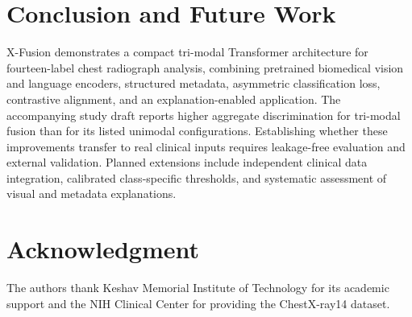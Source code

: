 \documentclass[conference,letterpaper]{IEEEtran}
\begin{document}
\section{Conclusion and Future Work}
X-Fusion demonstrates a compact tri-modal Transformer architecture for fourteen-label chest radiograph analysis, combining pretrained biomedical vision and language encoders, structured metadata, asymmetric classification loss, contrastive alignment, and an explanation-enabled application. The accompanying study draft reports higher aggregate discrimination for tri-modal fusion than for its listed unimodal configurations. Establishing whether these improvements transfer to real clinical inputs requires leakage-free evaluation and external validation. Planned extensions include independent clinical data integration, calibrated class-specific thresholds, and systematic assessment of visual and metadata explanations.

\section*{Acknowledgment}
The authors thank Keshav Memorial Institute of Technology for its academic support and the NIH Clinical Center for providing the ChestX-ray14 dataset.
\end{document}
